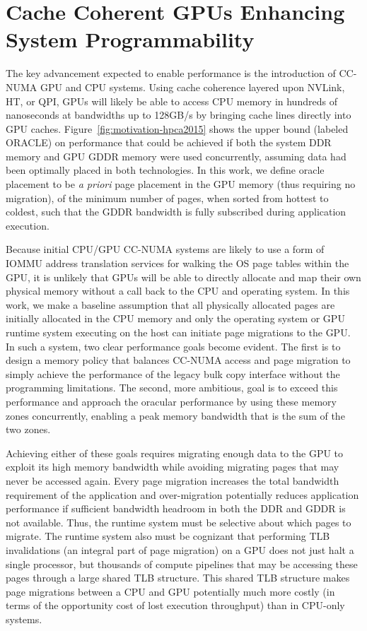 \section {Cache Coherent GPUs Enhancing System Programmability}
\label{chap:background:cc-enhances-programmability}
The key advancement expected to enable performance is the introduction of
CC-NUMA GPU and CPU systems.  Using cache coherence layered upon NVLink, HT, or
QPI, GPUs will likely be able to access CPU memory in hundreds of nanoseconds at
bandwidths up to 128GB/s by bringing cache lines directly into GPU caches.
Figure~\ref{fig:motivation-hpca2015} shows the upper bound (labeled ORACLE) on
performance that could be achieved if both the system DDR memory and GPU GDDR
memory were used concurrently, assuming data had been optimally placed in both
technologies.  In this work, we define oracle placement to be \emph{a priori}
page placement in the GPU memory (thus requiring no migration), of the minimum
number of pages, when sorted from hottest to coldest, such that the GDDR
bandwidth is fully subscribed during application execution.

Because initial CPU/GPU CC-NUMA systems are likely to use a form of IOMMU
address translation services for walking the OS page tables within the GPU,  it
is unlikely that GPUs will be able to directly allocate and map their own
physical memory without a call back to the CPU and operating system.  In this
work, we make a baseline assumption that all physically allocated pages are
initially allocated in the CPU memory and only the operating system or GPU
runtime system executing on the host can initiate page migrations to the GPU\@.
In such a system, two clear performance goals become evident.  The first is to
design a memory policy that balances CC-NUMA access and page migration to simply
achieve the performance of the legacy bulk copy interface without the
programming limitations.  The second, more ambitious, goal is to exceed this
performance and approach the oracular performance by using these memory zones
concurrently, enabling a peak memory bandwidth that is the sum of the two zones.

Achieving either of these goals requires migrating enough data to the GPU to
exploit its high memory bandwidth while avoiding migrating pages that may never
be accessed again.  Every page migration increases the total bandwidth
requirement of the application and over-migration potentially reduces
application performance if sufficient bandwidth headroom in both the DDR and
GDDR is not available.  Thus, the runtime system must be selective about which
pages to migrate.  The runtime system also must be cognizant that performing TLB
invalidations (an integral part of page migration) on a GPU does not just halt a
single processor, but thousands of compute pipelines that may be accessing these
pages through a large shared TLB structure.  This shared TLB structure makes
page migrations between a CPU and GPU potentially much more costly (in terms of
the opportunity cost of lost execution throughput) than in CPU-only systems.

